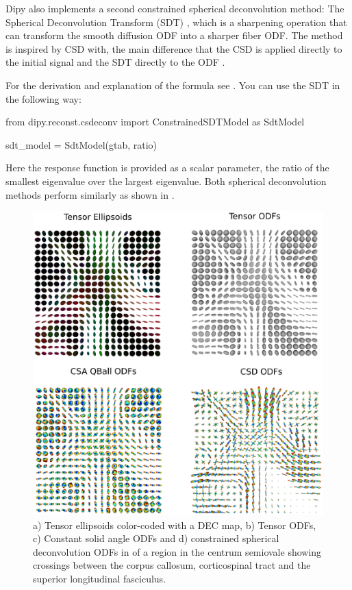\documentclass{bioinfo}
\begin{document}
Dipy also implements a second constrained spherical deconvolution method: The
Spherical Deconvolution Transform (SDT)
\citep{descoteaux-deriche-etal:09}, which is a sharpening
operation that can transform the smooth diffusion ODF into a sharper
fiber ODF. The method is
inspired by CSD \cite{tournier-calamante-etal:07} with, the main difference
that the CSD is applied directly to the initial signal and the SDT directly to
the ODF \citep{descoteaux:08,descoteaux-deriche-etal:09}.

For the derivation and explanation of the formula see \cite{descoteaux-deriche-etal:09}. You can use the SDT in the following way:
\begin{python}
from dipy.reconst.csdeconv import
                  ConstrainedSDTModel as SdtModel

sdt_model = SdtModel(gtab, ratio)
\end{python}
Here the response function is provided as a scalar parameter, the ratio of the
smallest eigenvalue over the largest eigenvalue. Both spherical deconvolution
methods perform similarly as shown in
\citep{descoteaux-deriche-etal:09,GaryfallidisISBI2013a}.

\begin{figure}[!htb]
\centerline{\includegraphics[width=180mm]{Figures/ten_csa_csd2.eps}}
\caption{a) Tensor ellipsoids color-coded with a DEC map, b) Tensor
  ODFs, c) Constant solid angle ODFs and d) constrained
  spherical deconvolution ODFs in of a region in the
centrum semiovale showing crossings between the corpus callosum,
corticospinal tract and the superior longitudinal
fasciculus.\label{Fig:ten_csa_csd}}
\end{figure}
\end{document}
